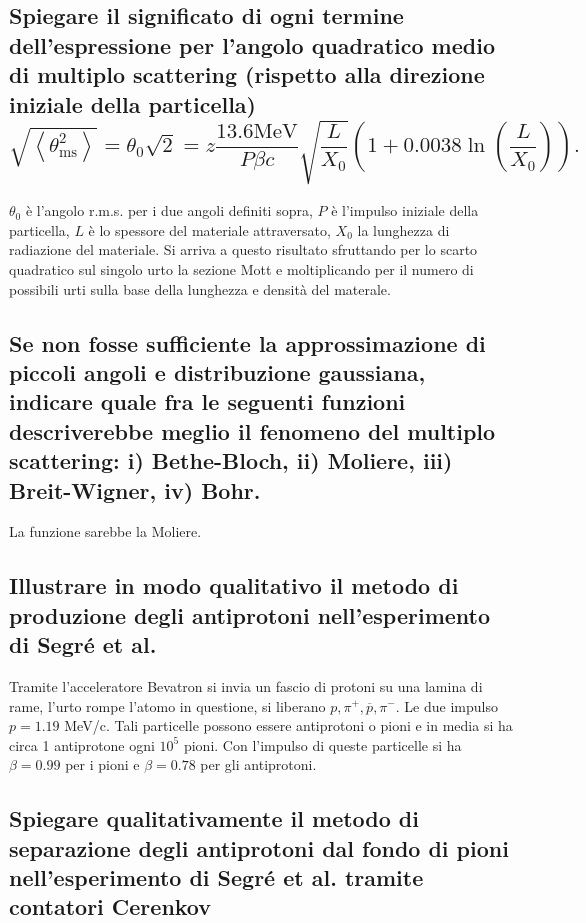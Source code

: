 \subsection[]{Spiegare il significato di ogni termine dell'espressione per l’angolo quadratico medio di multiplo scattering (rispetto alla direzione iniziale della particella)
\[
\sqrt{\left<\theta^2_{\text{ms}}\right>}=\theta_0\sqrt{2}=z\frac{13.6\text{MeV}}{P\beta c}\sqrt{\frac{L}{X_0}}\left(1+0.0038\ln\left(\frac{L}{X_0}\right)  \right)  
.\] 
}\label{sec:4.a.30}
$\theta_0$ è l'angolo r.m.s. per i due angoli definiti sopra, $P$ è l'impulso iniziale della particella, $L$ è lo spessore del materiale attraversato,  $X_0$ la lunghezza di radiazione del materiale. Si arriva a questo risultato sfruttando per lo scarto quadratico sul singolo urto la sezione Mott e moltiplicando per il numero di possibili urti sulla base della lunghezza e densità del materale.

\subsection[]{Se non fosse sufficiente la approssimazione di piccoli angoli e distribuzione gaussiana, indicare quale fra le seguenti funzioni descriverebbe meglio il fenomeno del multiplo scattering: i) Bethe-Bloch, ii) Moliere, iii) Breit-Wigner, iv) Bohr.
}\label{sec:4.a.31}
La funzione sarebbe la Moliere.

\subsection[]{Illustrare in modo qualitativo il metodo di produzione degli antiprotoni nell’esperimento di Segré et al.
}\label{sec:4.a.32}
Tramite l'acceleratore Bevatron si invia un fascio di protoni su una lamina di rame, l'urto rompe l'atomo in questione, si liberano $p, \pi^+, \overline{p}, \pi^-$. Le due  impulso $p= 1.19$ MeV/c.
Tali particelle possono essere antiprotoni o pioni e in media si ha circa 1 antiprotone ogni $10^{5}$ pioni. Con l'impulso di queste particelle si ha $\beta = 0.99$ per i pioni e $\beta=0.78$ per gli antiprotoni.

\subsection[]{Spiegare qualitativamente il metodo di separazione degli antiprotoni dal fondo di pioni nell’esperimento di Segré et al. tramite contatori Cerenkov
}\label{sec:4.a.33}

